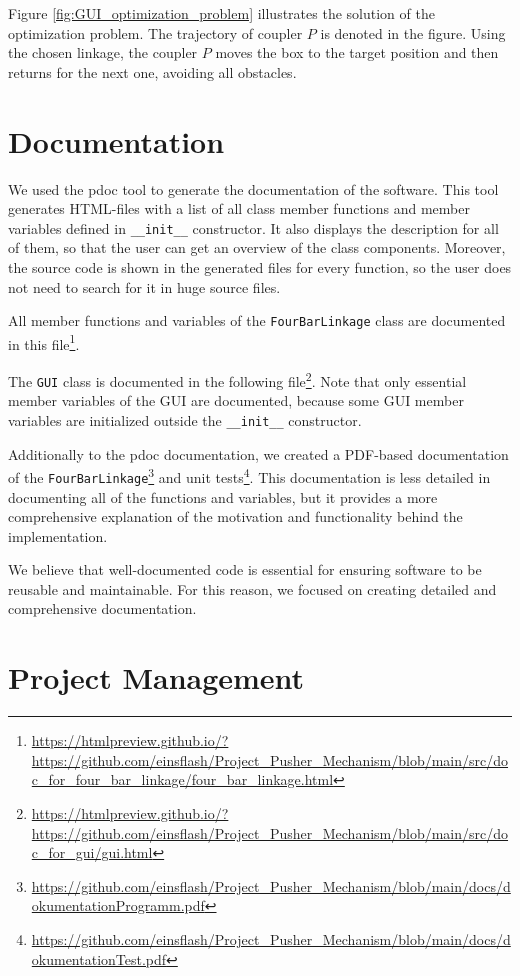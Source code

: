 \documentclass{article}
\begin{document}
Figure \ref{fig:GUI_optimization_problem} illustrates the solution of the optimization problem. The trajectory of coupler $P$ is denoted in the figure. Using the chosen linkage, the coupler $P$ moves the box to the target position and then returns for the next one, avoiding all obstacles.

\section{Documentation}\label{ch:doc}

We used the pdoc tool to generate the documentation of the software. This tool generates HTML-files with a list of all class member functions and member variables defined in \texttt{\_\_init\_\_} constructor. It also displays the description for all of them, so that the user can get an overview of the class components. Moreover, the source code is shown in the generated files for every function, so the user does not need to search for it in huge source files. 

All member functions and variables of the \texttt{FourBarLinkage} class are documented in this file\footnote{\url{https://htmlpreview.github.io/?https://github.com/einsflash/Project_Pusher_Mechanism/blob/main/src/doc_for_four_bar_linkage/four_bar_linkage.html}}.

The \texttt{GUI} class is documented in the following file\footnote{\url{https://htmlpreview.github.io/?https://github.com/einsflash/Project_Pusher_Mechanism/blob/main/src/doc_for_gui/gui.html}}. Note that only essential member variables of the GUI are documented, because some GUI member variables are initialized outside the \texttt{\_\_init\_\_} constructor.

Additionally to the pdoc documentation, we created a PDF-based documentation of the \texttt{FourBarLinkage}\footnote{\url{https://github.com/einsflash/Project_Pusher_Mechanism/blob/main/docs/dokumentationProgramm.pdf}} and unit tests\footnote{\url{https://github.com/einsflash/Project_Pusher_Mechanism/blob/main/docs/dokumentationTest.pdf}}. This documentation is less detailed in documenting all of the functions and variables, but it provides a more comprehensive explanation of the motivation and functionality behind the implementation.

We believe that well-documented code is essential for ensuring software to be reusable and maintainable. For this reason, we focused on creating detailed and comprehensive documentation.


\section{Project Management} \label{ch:projectmanagement}
\end{document}
